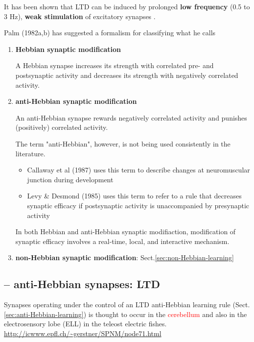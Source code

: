 It has been shown that LTD can be induced by prolonged {\bf low frequency} (0.5
to 3 Hz), {\bf weak stimulation} of excitatory synapses \citep{dudek1992}.

Palm (1982a,b) has suggested a formalism for classifying what he calls
\begin{enumerate}
  \item {\bf Hebbian synaptic modification}
  
  A Hebbian synapse increases its strength with correlated pre- and postsynaptic
  activity and decreases its strength with negatively correlated activity.

  \item {\bf anti-Hebbian synaptic modification}
  
  An anti-Hebbian synapse rewards negatively correlated activity and punishes
  (positively) correlated activity.
  
  The term "anti-Hebbian", however, is not being used consistently in the
  literature.
  \begin{itemize}
    \item Callaway et al (1987) uses this term to describe changes at neuromuscular
     junction during development
     
     \item Levy \& Desmond (1985) uses this term to refer to a rule
     that decreases synaptic efficacy if postsynaptic activity is unaccompanied
     by presynaptic activity 
  \end{itemize}

\begin{mdframed}

In both Hebbian and anti-Hebbian synaptic modifiaction, modification of synaptic
efficacy involves a real-time, local, and interactive mechanism.
\end{mdframed}  

  \item {\bf non-Hebbian synaptic modification}:
  Sect.\ref{sec:non-Hebbian-learning}
  
\end{enumerate}

\subsection{ -- anti-Hebbian synapses: LTD}
\label{sec:anti-Hebbian-synapse}

Synapses operating under the control of an LTD anti-Hebbian learning
rule (Sect.\ref{sec:anti-Hebbian-learning}) is thought to occur in the
\textcolor{red}{cerebellum} and also in the electrosensory lobe (ELL) in the teleost electric
fishes.
\url{http://icwww.epfl.ch/~gerstner/SPNM/node71.html}

